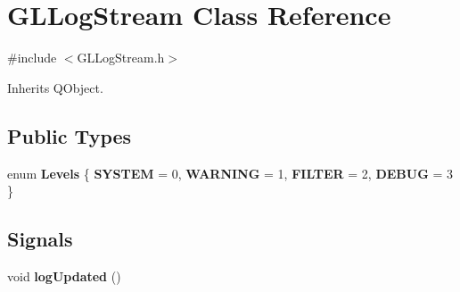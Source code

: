 \hypertarget{class_g_l_log_stream}{}\section{G\+L\+Log\+Stream Class Reference}
\label{class_g_l_log_stream}


{\ttfamily \#include $<$G\+L\+Log\+Stream.\+h$>$}



Inherits Q\+Object.

\subsection*{Public Types}
\begin{DoxyCompactItemize}
\item 
\mbox{\label{class_g_l_log_stream_af6d966e90f2222745df2a24bad857751}} 
enum {\bfseries Levels} \{ {\bfseries S\+Y\+S\+T\+EM} = 0, 
{\bfseries W\+A\+R\+N\+I\+NG} = 1, 
{\bfseries F\+I\+L\+T\+ER} = 2, 
{\bfseries D\+E\+B\+UG} = 3
 \}
\end{DoxyCompactItemize}
\subsection*{Signals}
\begin{DoxyCompactItemize}
\item 
\mbox{\label{class_g_l_log_stream_a3268e852711f1e29470e9b8433ae1f35}} 
void {\bfseries log\+Updated} ()
\end{DoxyCompactItemize}
